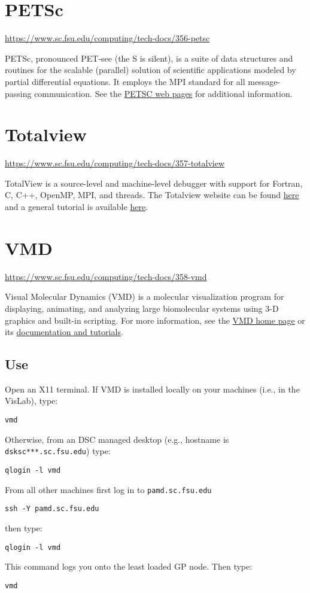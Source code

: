 \documentclass[12pt,a4paper]{article}
\begin{document}
\section{PETSc}
\url{https://www.sc.fsu.edu/computing/tech-docs/356-petsc}

PETSc, pronounced PET-see (the S is silent), is a suite of data structures and routines for the scalable (parallel) solution of scientific applications modeled by partial differential equations. It employs the MPI standard for all message-passing communication. See the \href{https://www.mcs.anl.gov/petsc/}{PETSC web pages} for additional information.

\section{Totalview}
\url{https://www.sc.fsu.edu/computing/tech-docs/357-totalview}

TotalView is a source-level and machine-level debugger with support for Fortran, C, C++, OpenMP, MPI, and threads. The Totalview website can be found \href{https://www.roguewave.com/products-services/totalview}{here} and a general tutorial is available \href{https://www.roguewave.com/sites/rw/files/resource-assets/TotalView_Tutorial.pdf}{here}.

\section{VMD}
\url{https://www.sc.fsu.edu/computing/tech-docs/358-vmd}

Visual Molecular Dynamics (VMD) is a molecular visualization program for displaying, animating, and analyzing large biomolecular systems using 3-D graphics and built-in scripting. For more information, see the \href{http://www.ks.uiuc.edu/Research/vmd/}{VMD home page} or its \href{http://www.ks.uiuc.edu/Research/vmd/current/docs.html}{documentation and tutorials}.

\subsection*{Use}
Open an X11 terminal.
If VMD is installed locally on your machines (i.e., in the VisLab), type:
\begin{verbatim}
vmd
\end{verbatim}
Otherwise, from an DSC managed desktop (e.g., hostname is \texttt{dsksc***.sc.fsu.edu}) type:
\begin{verbatim}
qlogin -l vmd
\end{verbatim}
From all other machines first log in to \texttt{pamd.sc.fsu.edu}
\begin{verbatim}
ssh -Y pamd.sc.fsu.edu
\end{verbatim}
then type:
\begin{verbatim}
qlogin -l vmd
\end{verbatim}
This command logs you onto the least loaded GP node. Then type:
\begin{verbatim}
vmd
\end{verbatim}
\end{document}
